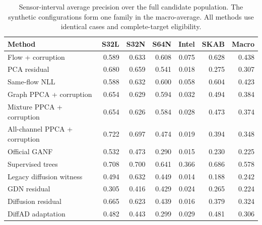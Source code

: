\begin{table}[t]
\centering
\caption{Sensor-interval average precision over the full candidate population. The synthetic configurations form one family in the macro-average. All methods use identical cases and complete-target eligibility.}
\label{tab:ap}
\small
\begin{tabular}{lrrrrrr}
\toprule
Method & S32L & S32N & S64N & Intel & SKAB & Macro \\
\midrule
Flow + corruption & 0.589 & 0.633 & 0.608 & 0.075 & 0.628 & 0.438 \\
PCA residual & 0.680 & 0.659 & 0.541 & 0.018 & 0.275 & 0.307 \\
Same-flow NLL & 0.588 & 0.632 & 0.600 & 0.058 & 0.604 & 0.423 \\
Graph PPCA + corruption & 0.654 & 0.629 & 0.594 & 0.032 & 0.494 & 0.384 \\
Mixture PPCA + corruption & 0.654 & 0.626 & 0.584 & 0.028 & 0.473 & 0.374 \\
All-channel PPCA + corruption & 0.722 & 0.697 & 0.474 & 0.019 & 0.394 & 0.348 \\
Official GANF & 0.532 & 0.473 & 0.290 & 0.015 & 0.230 & 0.225 \\
Supervised trees & 0.708 & 0.700 & 0.641 & 0.366 & 0.686 & 0.578 \\
Legacy diffusion witness & 0.494 & 0.632 & 0.449 & 0.014 & 0.188 & 0.242 \\
GDN residual & 0.305 & 0.416 & 0.429 & 0.024 & 0.265 & 0.224 \\
Diffusion residual & 0.665 & 0.623 & 0.439 & 0.016 & 0.379 & 0.324 \\
DiffAD adaptation & 0.482 & 0.443 & 0.299 & 0.029 & 0.481 & 0.306 \\
\bottomrule
\end{tabular}
\end{table}
